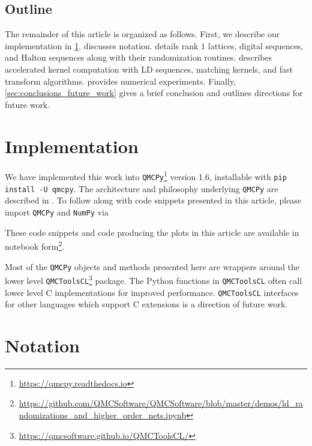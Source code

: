 \documentclass[acmsmall]{acmart}
\begin{document}
\subsection{Outline} 


The remainder of this article is organized as follows. First, we describe our implementation in \cref{sec:implementation}.  discusses notation.  details rank $1$ lattices, digital sequences, and Halton sequences along with their randomization routines.  describes accelerated kernel computation with LD sequences, matching kernels, and fast transform algorithms.  provides numerical experiments. Finally, \cref{sec:conclusions_future_work} gives a brief conclusion and outlines directions for future work. 

\section{Implementation} \label{sec:implementation}

We have implemented this work into \texttt{QMCPy}\footnote{\url{https://qmcpy.readthedocs.io}} version 1.6, installable with \texttt{pip install -U qmcpy}. The architecture and philosophy underlying \texttt{QMCPy} are described in \citep{choi.QMC_software,choi.challenges_great_qmc_software}. To follow along with code snippets presented in this article, please import \texttt{QMCPy} and \texttt{NumPy} \citep{NumPy.software} via 

These code snippets and code producing the plots in this article are available in notebook form\footnote{\url{https://github.com/QMCSoftware/QMCSoftware/blob/master/demos/ld_randomizations_and_higher_order_nets.ipynb}}.  

Most of the \texttt{QMCPy} objects and methods presented here are wrappers around the lower level \texttt{QMCToolsCL}\footnote{\url{https://qmcsoftware.github.io/QMCToolsCL/}} package. The Python functions in \texttt{QMCToolsCL} often call lower level C implementations for improved performance. \texttt{QMCToolsCL} interfaces for other languages which support C extensions is a direction of future work.

\section{Notation} \label{sec:notation}
\end{document}
